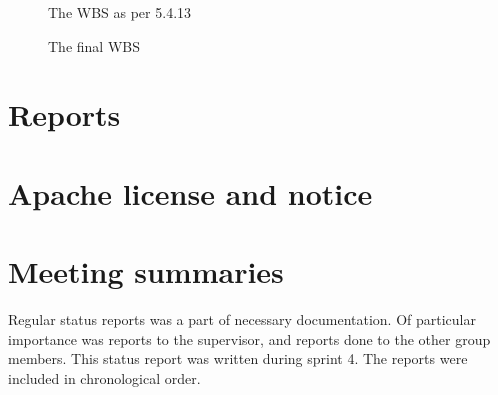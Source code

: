 \begin{figure}[p]
\setlength\fboxsep{0pt}
\setlength\fboxrule{1pt}\noindent{}
\caption{The WBS as per 5.4.13}
\label{fig:WBS54}
\end{figure}

\begin{figure}[p]
\setlength\fboxsep{0pt}
\setlength\fboxrule{1pt}\noindent{}
\caption{The final WBS}
\label{fig:WBSfin}
\end{figure}

\section{Reports}



\section{Apache license and notice}
\label{appendix:license}

\section{Meeting summaries}
Regular status reports was a part of necessary documentation. Of particular importance was reports to the supervisor, and reports done to the other group members. This status report was written during sprint 4. The reports were included in chronological order.










